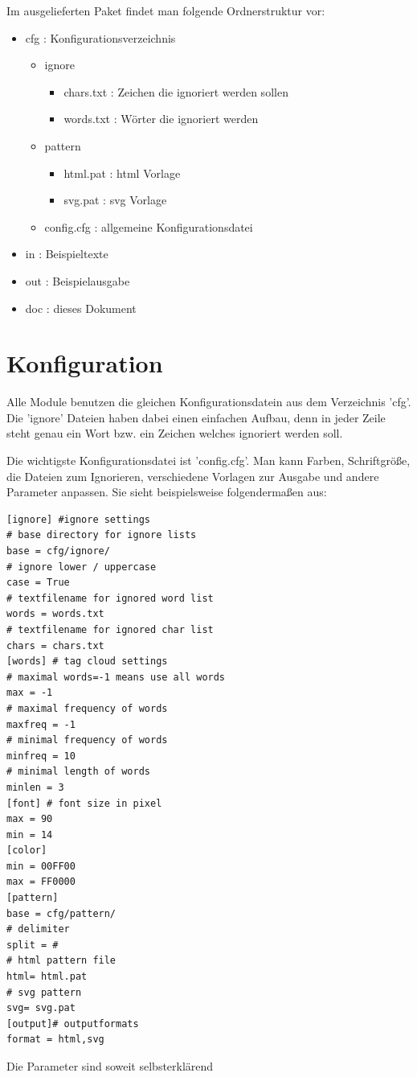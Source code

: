 Im ausgelieferten Paket findet man folgende Ordnerstruktur vor:
\begin{itemize}
    \item cfg : Konfigurationsverzeichnis
        \begin{itemize}
            \item ignore 
                \begin{itemize}
                    \item chars.txt : Zeichen die ignoriert werden sollen 
                    \item words.txt : Wörter die ignoriert werden
                \end{itemize}
            \item pattern
                \begin{itemize}
                    \item html.pat : html Vorlage
                    \item svg.pat : svg Vorlage
                \end{itemize}
            \item config.cfg : allgemeine Konfigurationsdatei
        \end{itemize}
    \item in : Beispieltexte  
    \item out : Beispielausgabe
    \item doc : dieses Dokument
\end{itemize}

\section{Konfiguration}
Alle Module benutzen die gleichen Konfigurationsdatein aus dem Verzeichnis 'cfg'.
Die 'ignore' Dateien haben dabei einen einfachen Aufbau, denn in jeder Zeile steht genau ein Wort bzw. ein Zeichen 
welches ignoriert werden soll.

Die wichtigste Konfigurationsdatei ist 'config.cfg'. Man kann Farben, Schriftgröße, die Dateien zum Ignorieren, verschiedene Vorlagen zur Ausgabe 
und andere Parameter anpassen.
Sie sieht beispielsweise folgendermaßen aus:
\begin{lstlisting}
[ignore] #ignore settings
# base directory for ignore lists
base = cfg/ignore/
# ignore lower / uppercase
case = True
# textfilename for ignored word list
words = words.txt
# textfilename for ignored char list
chars = chars.txt
[words] # tag cloud settings
# maximal words=-1 means use all words
max = -1
# maximal frequency of words
maxfreq = -1
# minimal frequency of words
minfreq = 10
# minimal length of words
minlen = 3
[font] # font size in pixel
max = 90
min = 14
[color]
min = 00FF00
max = FF0000
[pattern]
base = cfg/pattern/
# delimiter
split = #
# html pattern file
html= html.pat
# svg pattern
svg= svg.pat
[output]# outputformats 
format = html,svg
\end{lstlisting}
Die Parameter sind soweit selbsterklärend
